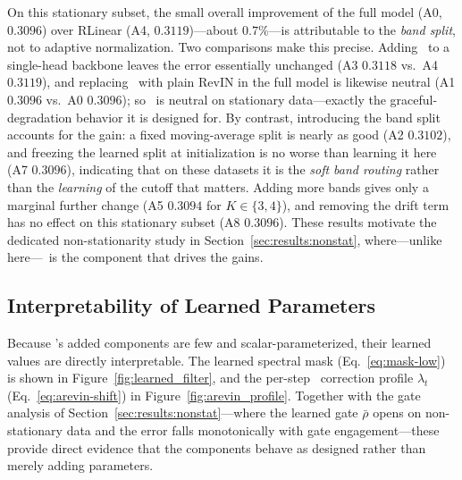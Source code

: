 On this stationary subset, the small overall improvement of the full model
(A0, $0.3096$) over RLinear (A4, $0.3119$)---about $0.7\%$---is attributable to
the \emph{band split}, not to adaptive normalization. Two comparisons make this
precise. Adding \arevin\ to a single-head backbone leaves the error essentially
unchanged (A3 $0.3118$ vs.\ A4 $0.3119$), and replacing \arevin\ with plain RevIN
in the full model is likewise neutral (A1 $0.3096$ vs.\ A0 $0.3096$); so
\arevin\ is neutral on stationary data---exactly the graceful-degradation
behavior it is designed for. By contrast, introducing the band split accounts for
the gain: a fixed moving-average split is nearly as good (A2 $0.3102$), and
freezing the learned split at initialization is no worse than learning it here
(A7 $0.3096$), indicating that on these datasets it is the \emph{soft band
routing} rather than the \emph{learning} of the cutoff that matters. Adding more
bands gives only a marginal further change (A5 $0.3094$ for $K\in\{3,4\}$), and
removing the drift term has no effect on this stationary subset (A8 $0.3096$).
These results motivate the dedicated non-stationarity study in
Section~\ref{sec:results:nonstat}, where---unlike here---\arevin\ is the
component that drives the gains.

\subsection{Interpretability of Learned Parameters}
\label{sec:ablation:interp}

Because \method's added components are few and scalar-parameterized, their
learned values are directly interpretable. The learned spectral mask
(Eq.~\ref{eq:mask-low}) is shown in Figure~\ref{fig:learned_filter}, and the
per-step \arevin\ correction profile $\lambda_t$ (Eq.~\ref{eq:arevin-shift}) in
Figure~\ref{fig:arevin_profile}. Together with the gate analysis of
Section~\ref{sec:results:nonstat}---where the learned gate $\bar\rho$ opens on
non-stationary data and the error falls monotonically with gate
engagement---these provide direct evidence that the components behave as designed
rather than merely adding parameters.
